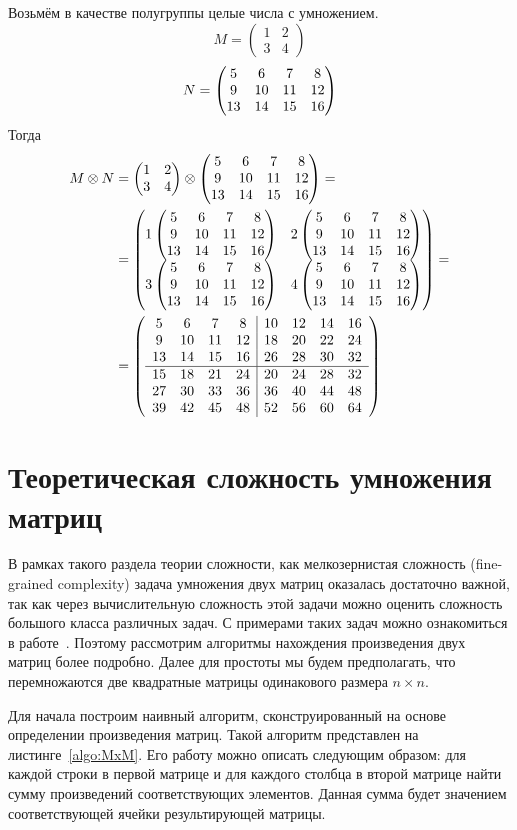 \begin{example}
Возьмём в качестве полугруппы целые числа с умножением.
$$M=
\begin{pmatrix}
1 & 2 \\
3 & 4
\end{pmatrix}
$$
$$N=\begin{pmatrix} 5 & 6 & 7 & 8 \\ 9 & 10 & 11 & 12 \\ 13 & 14 & 15 & 16 \end{pmatrix}
$$
Тогда
\begin{align}
M \otimes N & =
\begin{pmatrix}
1 & 2 \\
3 & 4
\end{pmatrix}
\otimes
\begin{pmatrix} 5 & 6 & 7 & 8 \\ 9 & 10 & 11 & 12 \\ 13 & 14 & 15 & 16 \end{pmatrix} = \notag \\ &=
\begin{pmatrix}
1\begin{pmatrix} 5 & 6 & 7 & 8 \\ 9 & 10 & 11 & 12 \\ 13 & 14 & 15 & 16 \end{pmatrix} & 2\begin{pmatrix} 5 & 6 & 7 & 8 \\ 9 & 10 & 11 & 12 \\ 13 & 14 & 15 & 16 \end{pmatrix} \\
3\begin{pmatrix} 5 & 6 & 7 & 8 \\ 9 & 10 & 11 & 12 \\ 13 & 14 & 15 & 16 \end{pmatrix} & 4\begin{pmatrix} 5 & 6 & 7 & 8 \\ 9 & 10 & 11 & 12 \\ 13 & 14 & 15 & 16 \end{pmatrix}
\end{pmatrix}
=\notag \\
&=
\left(\begin{array}{c c c c | c c c c}
5  & 6  & 7  & 8  & 10 & 12 & 14 & 16 \\
9  & 10 & 11 & 12 & 18 & 20 & 22 & 24 \\
13 & 14 & 15 & 16 & 26 & 28 & 30 & 32 \\
\hline
15 & 18 & 21 & 24 & 20 & 24 & 28 & 32 \\
27 & 30 & 33 & 36 & 36 & 40 & 44 & 48 \\
39 & 42 & 45 & 48 & 52 & 56 & 60 & 64
\end{array}\right)
\end{align}
\end{example}


\section{Теоретическая сложность умножения матриц}

В рамках такого раздела теории сложности, как мелкозернистая сложность (fine-grained complexity) задача умножения двух матриц оказалась достаточно важной, так как через вычислительную сложность этой задачи можно оценить сложность большого класса различных задач. С примерами таких задач можно ознакомиться в работе~\cite{Williams:2010:SEP:1917827.1918339}. Поэтому рассмотрим алгоритмы нахождения произведения двух матриц более подробно. Далее для простоты мы будем предполагать, что перемножаются две квадратные матрицы одинакового размера $n \times n$.

Для начала построим наивный алгоритм, сконструированный на основе определении произведения матриц. Такой алгоритм представлен на листинге~\ref{algo:MxM}. Его работу можно описать следующим образом: для каждой строки в первой матрице и для каждого столбца в второй матрице найти сумму произведений соответствующих элементов. Данная сумма будет значением соответствующей ячейки результирующей матрицы.

